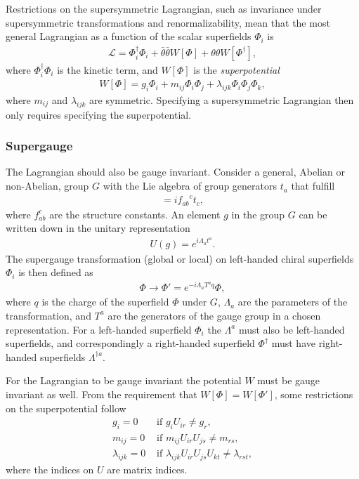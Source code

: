 \documentclass[twoside,english]{uiofysmaster}
\begin{document}
Restrictions on the supersymmetric Lagrangian, such as invariance under supersymmetric transformations and renormalizability, mean that the most general Lagrangian as a function of the scalar superfields $\Phi_i$ is
\begin{align}
\mathcal{L} = \Phi_i^{\dagger} \Phi_i + \bar{\theta} \bar{\theta} W[\Phi] + \theta \theta W[\Phi^{\dagger}],
\end{align}
where $\Phi_i^{\dagger} \Phi_i$ is the kinetic term, and $W[\Phi]$ is the \textit{superpotential}
\begin{align}\label{Eq:: superpotential}
W[\Phi] = g_i \Phi_i + m_{ij} \Phi_i \Phi_j + \lambda_{ijk} \Phi_i \Phi_j \Phi_k,
\end{align}
where $m_{ij}$ and $\lambda_{ijk}$ are symmetric. Specifying a supersymmetric Lagrangian then only requires specifying the superpotential. 

\subsubsection{Supergauge}\label{Sec:: phys back : Supergauge}



The Lagrangian should also be gauge invariant. Consider a general, Abelian or non-Abelian, group $G$ with the Lie algebra of group generators $t_a$ that fulfill
\begin{align}
[t_a, t_b] = i {f_{ab}}^ct_c,
\end{align}
where ${f_{ab}^c}$ are the structure constants. An element $g$ in the group $G$ can be written down in the unitary representation
\begin{align}
U(g) = e^{i \Lambda_at^a}. 
\end{align}
The supergauge transformation (global or local) on left-handed chiral superfields $\Phi_i$ is then defined as \cite{batzing2017lecture} 
\begin{align}
\Phi \rightarrow \Phi' = e^{-i \Lambda_a T^a q} \Phi,
\end{align} 
where $q$ is the charge of the superfield $\Phi$ under $G$, $\Lambda_a$ are the parameters of the transformation, and $T^a$ are the generators of the gauge group in a chosen representation. For a left-handed superfield $\Phi_i$ the $\Lambda^a$ must also be left-handed superfields, and correspondingly a right-handed superfield $\Phi^{\dagger}$ must have right-handed superfields $\Lambda^{\dagger a}$. 

For the Lagrangian to be gauge invariant the potential $W$ must be gauge invariant as well. From the requirement that $W[\Phi] = W[\Phi']$, some restrictions on the superpotential follow
\begin{align}
g_i = 0 &\text{ if } g_i U_{ir} \neq g_r,\\
m_{ij} = 0 &\text{ if } m_{ij} U_{ir} U_{js} \neq m_{rs},\\
\lambda_{ijk} = 0 &\text{ if } \lambda_{ijk}U_{ir}U_{js}U_{kt} \neq \lambda_{rst},
\end{align} 
where the indices on $U$ are matrix indices. 
\end{document}
